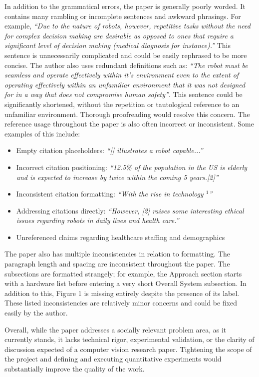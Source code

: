 \documentclass{article}
\theoremstyle{definition}
\begin{document}
\noindent
In addition to the grammatical errors, the paper is generally poorly worded.
It contains many rambling or incomplete sentences and awkward phrasings.
For example, \emph{``Due to the nature of robots, however, repetitive tasks without the need for complex
decision making are desirable as opposed to ones that require a significant level of decision
making (medical diagnosis for instance).''} 
This sentence is unnecessarily complicated and could be easily rephrased to be more concise.
The author also uses redundant definitions such as: \emph{``The robot must be seamless and operate effectively within it’s environment even to the extent of
    operating effectively within an unfamiliar environment that it was not designed for in a way
    that does not compromise human safety''}.
This sentence could be significantly shortened, without the repetition or tautological reference to an unfamiliar environment.
Thorough proofreading would resolve this concern.
The reference usage throughout the paper is also often incorrect or inconsistent.
Some examples of this include:
\begin{itemize}
    \item Empty citation placeholders: \emph{``[] illustrates a robot capable...''}
    \item Incorrect citation positioning: \emph{``12.5\% of the population in the US is elderly and is expected to increase by
twice within the coming 5 years.[2]''}
    \item Inconsistent citation formatting: \emph{``With the rise in technology $^1$''}
    \item Addressing citations directly: \emph{``However, [2] raises some interesting ethical issues regarding robots in daily lives and health care.''}
    \item Unreferenced claims regarding healthcare staffing and demographics
\end{itemize}

\noindent
The paper also has multiple inconsistencies in relation to formatting.
The paragraph length and spacing are inconsistent throughout the paper. 
The subsections are formatted strangely; for example, 
the Approach section starts with a hardware list before entering a very short Overall System subsection.
In addition to this, Figure 1 is missing entirely despite the presence of its label.
These listed inconsistencies are relatively minor concerns
and could be fixed easily by the author.

Overall, while the paper addresses a socially relevant problem area, 
as it currently stands, it lacks technical rigor, experimental validation, 
or the clarity of discussion expected of a computer vision research paper.
Tightening the scope of the project and defining and executing quantitative experiments
would substantially improve the quality of the work.
\end{document}
